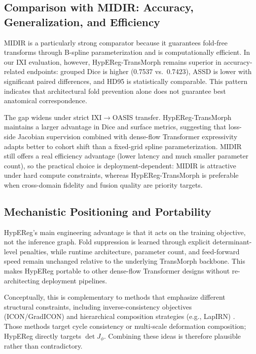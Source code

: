 \documentclass[jimaging,article,submit,pdftex,moreauthors]{Definitions/mdpi}
\begin{document}
\subsection{Comparison with MIDIR: Accuracy, Generalization, and Efficiency}
MIDIR is a particularly strong comparator because it guarantees fold-free transforms through B-spline parameterization and is computationally efficient. In our IXI evaluation, however, HypEReg-TransMorph remains superior in accuracy-related endpoints: grouped Dice is higher (0.7537 vs.\ 0.7423), ASSD is lower with significant paired differences, and HD95 is statistically comparable. This pattern indicates that architectural fold prevention alone does not guarantee best anatomical correspondence.

The gap widens under strict IXI\(\to\)OASIS transfer. HypEReg-TransMorph maintains a larger advantage in Dice and surface metrics, suggesting that loss-side Jacobian supervision combined with dense-flow Transformer expressivity adapts better to cohort shift than a fixed-grid spline parameterization. MIDIR still offers a real efficiency advantage (lower latency and much smaller parameter count), so the practical choice is deployment-dependent: MIDIR is attractive under hard compute constraints, whereas HypEReg-TransMorph is preferable when cross-domain fidelity and fusion quality are priority targets.

\subsection{Mechanistic Positioning and Portability}
HypEReg's main engineering advantage is that it acts on the training objective, not the inference graph. Fold suppression is learned through explicit determinant-level penalties, while runtime architecture, parameter count, and feed-forward speed remain unchanged relative to the underlying TransMorph backbone. This makes HypEReg portable to other dense-flow Transformer designs without re-architecting deployment pipelines.

Conceptually, this is complementary to methods that emphasize different structural constraints, including inverse-consistency objectives (ICON/GradICON) and hierarchical composition strategies (e.g., LapIRN) \cite{greer2021icon,tian2023gradicon,mok2020lapirn}. Those methods target cycle consistency or multi-scale deformation composition; HypEReg directly targets \(\det J_\phi\). Combining these ideas is therefore plausible rather than contradictory.
\end{document}
